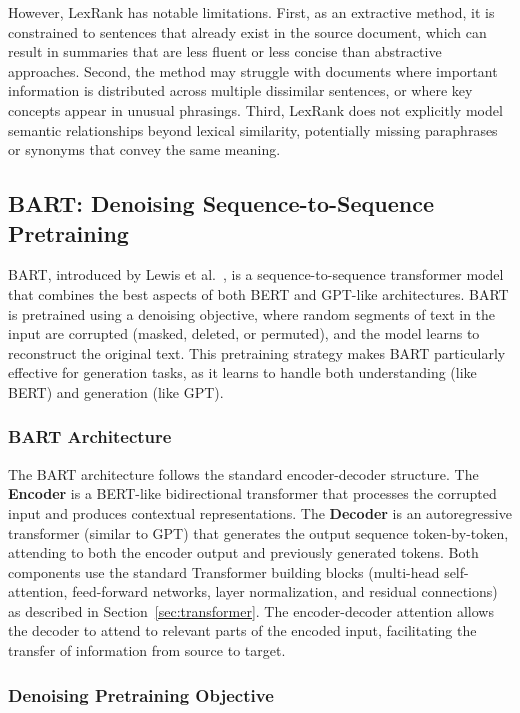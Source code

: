However, LexRank has notable limitations. First, as an extractive method, it is constrained to sentences that already exist in the source document, which can result in summaries that are less fluent or less concise than abstractive approaches. Second, the method may struggle with documents where important information is distributed across multiple dissimilar sentences, or where key concepts appear in unusual phrasings. Third, LexRank does not explicitly model semantic relationships beyond lexical similarity, potentially missing paraphrases or synonyms that convey the same meaning.

\subsection{BART: Denoising Sequence-to-Sequence Pretraining}

\gls{BART}, introduced by Lewis et al.~\cite{lewis2019bart}, is a sequence-to-sequence transformer model that combines the best aspects of both \gls{BERT} and \gls{GPT}-like architectures. \gls{BART} is pretrained using a denoising objective, where random segments of text in the input are corrupted (masked, deleted, or permuted), and the model learns to reconstruct the original text. This pretraining strategy makes \gls{BART} particularly effective for generation tasks, as it learns to handle both understanding (like \gls{BERT}) and generation (like \gls{GPT}).

\subsubsection{BART Architecture}

The \gls{BART} architecture follows the standard encoder-decoder structure. The \textbf{Encoder} is a \gls{BERT}-like bidirectional transformer that processes the corrupted input and produces contextual representations. The \textbf{Decoder} is an autoregressive transformer (similar to \gls{GPT}) that generates the output sequence token-by-token, attending to both the encoder output and previously generated tokens. Both components use the standard Transformer building blocks (multi-head self-attention, feed-forward networks, layer normalization, and residual connections) as described in Section~\ref{sec:transformer}. The encoder-decoder attention allows the decoder to attend to relevant parts of the encoded input, facilitating the transfer of information from source to target.

\subsubsection{Denoising Pretraining Objective}

